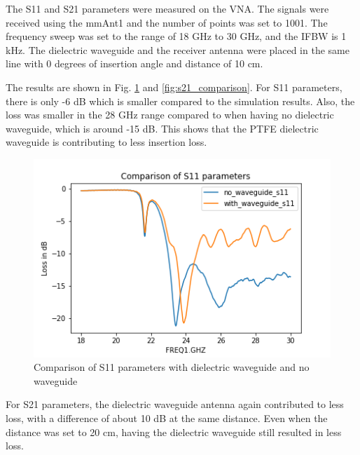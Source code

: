 \documentclass[a4paper,12pt]{report}
\begin{document}
The S11 and S21 parameters were measured on the VNA.
The signals were received using the mmAnt1
and the number of points was set to 1001.
The frequency sweep was set to the range of 18 GHz to 30 GHz,
and the IFBW is 1 kHz.
The dielectric waveguide and the receiver antenna were placed
in the same line with 0 degrees of insertion angle
and distance of 10 cm.

The results are shown in
Fig. \ref{fig:s11_comparison} and \ref{fig:s21_comparison}.
For S11 parameters,
there is only -6 dB which is smaller compared to the simulation results.
Also, the loss was smaller in the 28 GHz range
compared to when having no dielectric waveguide,
which is around -15 dB.
This shows that the PTFE dielectric waveguide
is contributing to less insertion loss.

\begin{figure}
  \begin{center}
    \includegraphics[clip, keepaspectratio, width=0.9\linewidth]{img/s11_comparison.png}
    \caption{Comparison of S11 parameters with dielectric waveguide and no waveguide}
    \label{fig:s11_comparison} 
  \end{center}
\end{figure}

For S21 parameters,
the dielectric waveguide antenna again contributed to less loss,
with a difference of about 10 dB at the same distance.
Even when the distance was set to 20 cm,
having the dielectric waveguide still resulted in less loss.
\end{document}

